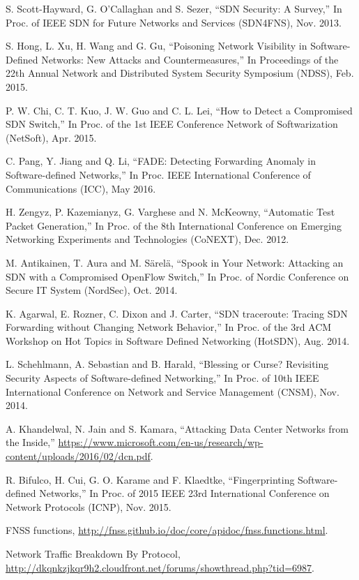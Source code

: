 \documentclass[conference]{IEEEtran}
\begin{document}
\begin{thebibliography}{1}

S. Scott-Hayward, G. O'Callaghan and S. Sezer,
``SDN Security: A Survey,'' In Proc. of IEEE SDN for Future Networks and Services (SDN4FNS), Nov. 2013.

S. Hong, L. Xu, H. Wang and G. Gu,
``Poisoning Network Visibility in Software-Defined Networks: New Attacks and Countermeasures,''  In Proceedings of the 22th Annual Network and Distributed System Security Symposium (NDSS), Feb. 2015.

P. W. Chi, C. T. Kuo, J. W. Guo and C. L. Lei,
``How to Detect a Compromised SDN Switch,'' In Proc. of the 1st IEEE Conference Network of Softwarization (NetSoft), Apr. 2015.

C. Pang, Y. Jiang and Q. Li,
``FADE: Detecting Forwarding Anomaly in Software-defined Networks,'' In Proc. IEEE International Conference of Communications (ICC), May 2016.

H. Zengyz, P. Kazemianyz, G. Varghese and N. McKeowny,
``Automatic Test Packet Generation,'' In Proc. of the 8th International Conference on Emerging Networking Experiments and Technologies (CoNEXT), Dec. 2012.

M. Antikainen, T. Aura and M. Särelä,
``Spook in Your Network: Attacking an SDN with a Compromised OpenFlow Switch,'' In Proc. of Nordic Conference on Secure IT System (NordSec), Oct. 2014.

K. Agarwal, E. Rozner, C. Dixon and J. Carter,
``SDN traceroute: Tracing SDN Forwarding without Changing Network Behavior,'' In Proc. of the 3rd ACM Workshop on Hot Topics in Software Defined Networking (HotSDN), Aug. 2014.

L. Schehlmann, A. Sebastian and B. Harald, 
``Blessing or Curse? Revisiting Security Aspects of Software-defined Networking,'' In Proc. of 10th IEEE International Conference on Network and Service Management (CNSM), Nov. 2014.

A. Khandelwal, N. Jain and S. Kamara,
``Attacking Data Center Networks from the Inside,'' \url{https://www.microsoft.com/en-us/research/wp-content/uploads/2016/02/dcn.pdf}.
 
R. Bifulco, H. Cui, G. O. Karame and F. Klaedtke,
``Fingerprinting Software-defined Networks,'' In Proc. of 2015 IEEE 23rd International Conference on Network Protocols (ICNP), Nov. 2015.

FNSS functions, \url{http://fnss.github.io/doc/core/apidoc/fnss.functions.html}.

Network Traffic Breakdown By Protocol, \url{http://dkqnkzjkqr9h2.cloudfront.net/forums/showthread.php?tid=6987}.
\end{thebibliography}
\end{document}
